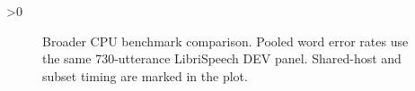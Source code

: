 \ifnum\ColdRowsCount>0
\begin{figure}[t]
\centering
\def\moneyfullplot{1}%
%
\caption{Broader CPU benchmark comparison. Pooled word error rates use the same
730-utterance LibriSpeech DEV panel. Shared-host and subset timing are marked
in the plot. \MoneyFullMarksCaption{}}
\label{fig:fullcomparison}
\end{figure}
\fi
